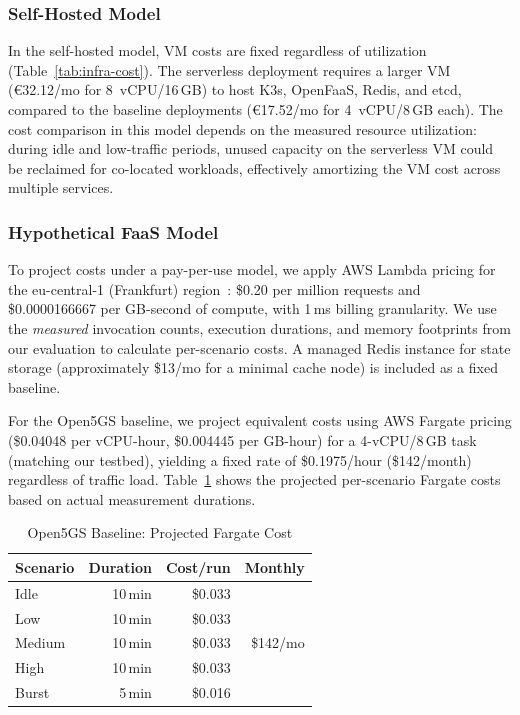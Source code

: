 \subsubsection{Self-Hosted Model}

In the self-hosted model, VM costs are fixed regardless of utilization (Table~\ref{tab:infra-cost}). The serverless deployment requires a larger VM (\euro32.12/mo for 8~vCPU/16\,GB) to host K3s, OpenFaaS, Redis, and etcd, compared to the baseline deployments (\euro17.52/mo for 4~vCPU/8\,GB each). The cost comparison in this model depends on the measured resource utilization: during idle and low-traffic periods, unused capacity on the serverless VM could be reclaimed for co-located workloads, effectively amortizing the VM cost across multiple services.

\subsubsection{Hypothetical FaaS Model}

To project costs under a pay-per-use model, we apply AWS Lambda pricing for the eu-central-1 (Frankfurt) region~\cite{aws-lambda-pricing}: \$0.20 per million requests and \$0.0000166667 per GB-second of compute, with 1\,ms billing granularity. We use the \textit{measured} invocation counts, execution durations, and memory footprints from our evaluation to calculate per-scenario costs. A managed Redis instance for state storage (approximately \$13/mo for a minimal cache node) is included as a fixed baseline.

For the Open5GS baseline, we project equivalent costs using AWS Fargate pricing (\$0.04048 per vCPU-hour, \$0.004445 per GB-hour) for a 4-vCPU/8\,GB task (matching our testbed), yielding a fixed rate of \$0.1975/hour (\$142/month) regardless of traffic load. Table~\ref{tab:open5gs-cost} shows the projected per-scenario Fargate costs based on actual measurement durations.

\begin{table}[t]
\centering
\caption{Open5GS Baseline: Projected Fargate Cost}
\label{tab:open5gs-cost}
\footnotesize
\begin{tabular}{@{}lrrr@{}}
\toprule
\textbf{Scenario} & \textbf{Duration} & \textbf{Cost/run} & \textbf{Monthly} \\
\midrule
Idle      & 10\,min & \$0.033 & \multirow{5}{*}{\$142/mo} \\
Low       & 10\,min & \$0.033 & \\
Medium    & 10\,min & \$0.033 & \\
High      & 10\,min & \$0.033 & \\
Burst     & 5\,min  & \$0.016 & \\
\bottomrule
\end{tabular}
\end{table}

